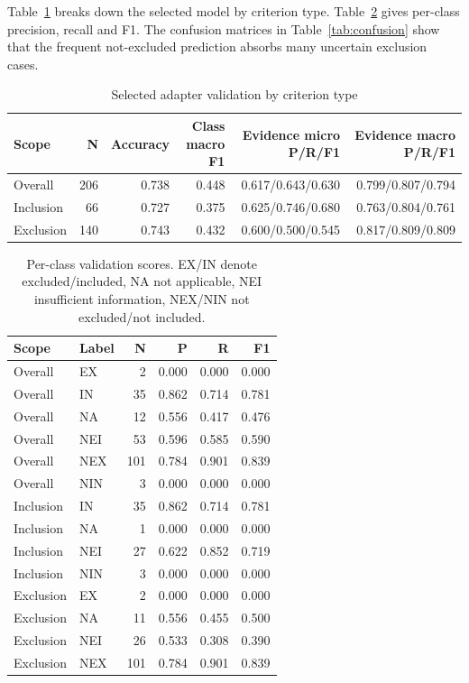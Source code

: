 Table~\ref{tab:detail} breaks down the selected model by criterion type. Table~\ref{tab:classes} gives per-class precision, recall and F1. The confusion matrices in Table~\ref{tab:confusion} show that the frequent not-excluded prediction absorbs many uncertain exclusion cases.
\begin{table}[t]
\centering\caption{Selected adapter validation by criterion type}\label{tab:detail}
\begin{tabular}{lrrrrr}
\toprule
Scope & N & Accuracy & Class macro F1 & Evidence micro P/R/F1 & Evidence macro P/R/F1\\\midrule
Overall & 206 & 0.738 & 0.448 & 0.617/0.643/0.630 & 0.799/0.807/0.794\\
Inclusion & 66 & 0.727 & 0.375 & 0.625/0.746/0.680 & 0.763/0.804/0.761\\
Exclusion & 140 & 0.743 & 0.432 & 0.600/0.500/0.545 & 0.817/0.809/0.809\\
\bottomrule
\end{tabular}
\end{table}
\begin{table}[t]
\centering\caption{Per-class validation scores. EX/IN denote excluded/included, NA not applicable, NEI insufficient information, NEX/NIN not excluded/not included.}\label{tab:classes}
\begin{tabular}{llrrrr}
\toprule
Scope & Label & N & P & R & F1\\\midrule
Overall & EX & 2 & 0.000 & 0.000 & 0.000\\
Overall & IN & 35 & 0.862 & 0.714 & 0.781\\
Overall & NA & 12 & 0.556 & 0.417 & 0.476\\
Overall & NEI & 53 & 0.596 & 0.585 & 0.590\\
Overall & NEX & 101 & 0.784 & 0.901 & 0.839\\
Overall & NIN & 3 & 0.000 & 0.000 & 0.000\\
Inclusion & IN & 35 & 0.862 & 0.714 & 0.781\\
Inclusion & NA & 1 & 0.000 & 0.000 & 0.000\\
Inclusion & NEI & 27 & 0.622 & 0.852 & 0.719\\
Inclusion & NIN & 3 & 0.000 & 0.000 & 0.000\\
Exclusion & EX & 2 & 0.000 & 0.000 & 0.000\\
Exclusion & NA & 11 & 0.556 & 0.455 & 0.500\\
Exclusion & NEI & 26 & 0.533 & 0.308 & 0.390\\
Exclusion & NEX & 101 & 0.784 & 0.901 & 0.839\\
\bottomrule
\end{tabular}
\end{table}
